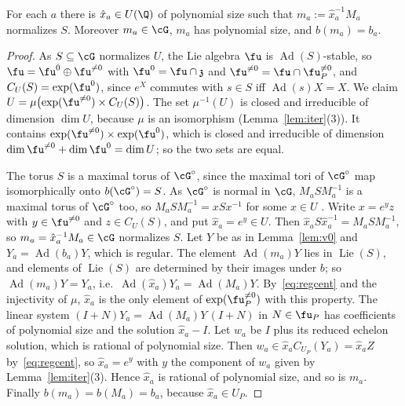 \begin{lemma}\label{lem:xhat}
For each $a$ there is $\hat x_a\in U(\Q)$ of polynomial size such that $m_a:=\hat x_a^{-1}M_a$ normalizes
$S$. Moreover $m_a\in\cG$, $m_a$ has polynomial size, and $b(m_a)=b_a$.
\end{lemma}
\begin{proof}
As $S\subseteq\cG$ normalizes $U$, the Lie algebra $\fu$ is $\operatorname{Ad}(S)$-stable, so
$\fu=\fu^0\oplus\fu^{\ne0}$ with $\fu^0=\fu\cap\mathfrak z$ and $\fu^{\ne0}=\fu\cap\fu_P^{\ne0}$, and
$C_U(S)=\exp(\fu^0)$, since $e^X$ commutes with $s\in S$ iff $\operatorname{Ad}(s)X=X$. We claim
$U=\mu\bigl(\exp(\fu^{\ne0})\times C_U(S)\bigr)$. The set $\mu^{-1}(U)$ is closed and irreducible of dimension
$\dim U$, because $\mu$ is an isomorphism (Lemma~\ref{lem:iter}(3)). It contains
$\exp(\fu^{\ne0})\times\exp(\fu^0)$, which is closed and irreducible of dimension
$\dim\fu^{\ne0}+\dim\fu^0=\dim U$; so the two sets are equal.

The torus $S$ is a maximal torus of $\cG^\circ$, since the maximal tori of $\cG^\circ$ map isomorphically onto
$b(\cG^\circ)=S$. As $\cG^\circ$ is normal in $\cG$, $M_aSM_a^{-1}$ is a maximal torus of $\cG^\circ$ too, so
$M_aSM_a^{-1}=xSx^{-1}$ for some $x\in U$ \cite[10.6]{Bor91}. Write $x=e^yz$ with $y\in\fu^{\ne0}$ and
$z\in C_U(S)$, and put $\hat x_a=e^y\in U$. Then $\hat x_aS\hat x_a^{-1}=M_aSM_a^{-1}$, so
$m_a=\hat x_a^{-1}M_a\in\cG$ normalizes $S$. Let $Y$ be as in Lemma~\ref{lem:v0} and $Y_a=\operatorname{Ad}(b_a)Y$,
which is regular. The element $\operatorname{Ad}(m_a)Y$ lies in $\operatorname{Lie}(S)$, and elements of $\operatorname{Lie}(S)$ are determined by
their images under $b$; so $\operatorname{Ad}(m_a)Y=Y_a$, i.e.\ $\operatorname{Ad}(\hat x_a)Y_a=\operatorname{Ad}(M_a)Y$. By~\eqref{eq:regcent}
and the injectivity of $\mu$, $\hat x_a$ is the only element of $\exp(\fu_P^{\ne0})$ with this property.
The linear system $(I+N)Y_a=\operatorname{Ad}(M_a)Y\,(I+N)$ in $N\in\fu_P$ has coefficients of polynomial size and the
solution $\hat x_a-I$. Let $w_a$ be $I$ plus its reduced echelon solution, which is rational of
polynomial size. Then $w_a\in\hat x_aC_{U_P}(Y_a)=\hat x_aZ$ by~\eqref{eq:regcent}, so $\hat x_a=e^y$ with
$y$ the component of $w_a$ given by Lemma~\ref{lem:iter}(3). Hence $\hat x_a$ is rational of polynomial
size, and so is $m_a$. Finally $b(m_a)=b(M_a)=b_a$, because $\hat x_a\in U_P$.
\end{proof}

